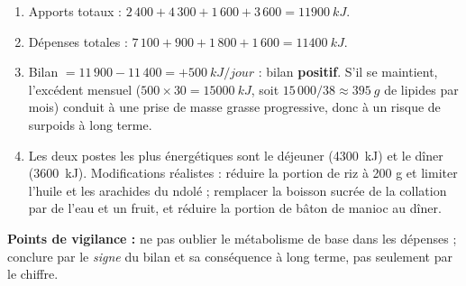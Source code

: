 \documentclass[11pt]{article}
\newcounter{popsec}
\newcounter{popsub}
\newcommand{\courssub}[1]{%
  \stepcounter{popsub}%
  \par\vspace{9pt}\noindent{\popxbold\fontsize{11.5}{13}\selectfont\color{popink}{\color{poporange}\thepopsec.\thepopsub}\hspace{6pt}#1}\par\nopagebreak\vspace{4pt}
}
\begin{document}
\courssub{Je m'entraîne}

\begin{corrige}
\begin{enumerate}
\item Apports totaux : $2\,400 + 4\,300 + 1\,600 + 3\,600 = \SI{11900}{kJ}$.
\item Dépenses totales : $7\,100 + 900 + 1\,800 + 1\,600 = \SI{11400}{kJ}$.
\item Bilan $= 11\,900 - 11\,400 = +\SI{500}{kJ/jour}$ : bilan \textbf{positif}. S'il se maintient, l'excédent mensuel ($500 \times 30 = \SI{15000}{kJ}$, soit $15\,000/38 \approx \SI{395}{g}$ de lipides par mois) conduit à une prise de masse grasse progressive, donc à un risque de surpoids à long terme.
\item Les deux postes les plus énergétiques sont le déjeuner (\SI{4300}{kJ}) et le dîner (\SI{3600}{kJ}). Modifications réalistes : réduire la portion de riz à 200 g et limiter l'huile et les arachides du ndolé ; remplacer la boisson sucrée de la collation par de l'eau et un fruit, et réduire la portion de bâton de manioc au dîner.
\end{enumerate}
\textbf{Points de vigilance :} ne pas oublier le métabolisme de base dans les dépenses ; conclure par le \emph{signe} du bilan et sa conséquence à long terme, pas seulement par le chiffre.
\end{corrige}
\end{document}
